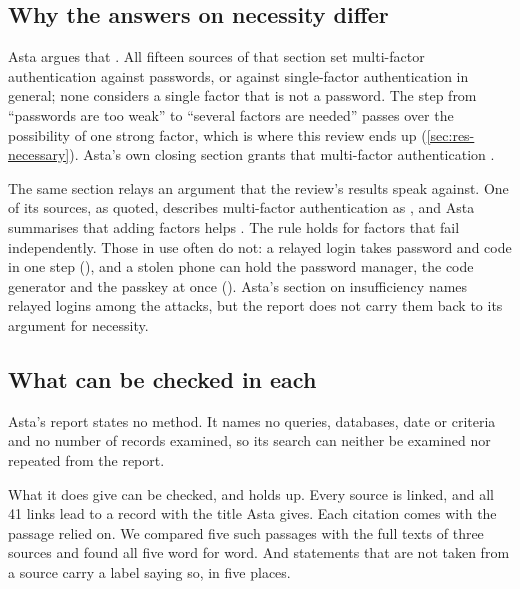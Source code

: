 \begin{refsection}
\subsection{Why the answers on necessity differ}

Asta argues that
.
All fifteen sources of that section set multi-factor authentication
against passwords, or against single-factor authentication in general;
none considers a single factor that is not a password.
The step from \enquote{passwords are too weak} to \enquote{several
factors are needed} passes over the possibility of one strong factor,
which is where this review ends up (\cref{sec:res-necessary}).
Asta's own closing section grants that multi-factor authentication
.

The same section relays an argument that the review's results speak
against.
One of its sources, as quoted, describes multi-factor authentication as
, and Asta summarises that adding factors helps
.
The rule holds for factors that fail independently.
Those in use often do not: a relayed login takes password and code in
one step (), and a stolen phone can hold the password
manager, the code generator and the passkey at once ().
Asta's section on insufficiency names relayed logins among the attacks,
but the report does not carry them back to its argument for necessity.

\subsection{What can be checked in each}

Asta's report states no method.
It names no queries, databases, date or criteria and no number of
records examined, so its search can neither be examined nor repeated
from the report.

What it does give can be checked, and holds up.
Every source is linked, and all 41 links lead to a record with the
title Asta gives.
Each citation comes with the passage relied on.
We compared five such passages with the full texts of three sources
\autocite{Klivan2023Recovery,Ngandu2025PasswordManagement,Husak2016HTTPS}
and found all five word for word.
And statements that are not taken from a source carry a label saying
so, in five places.


\end{refsection}
